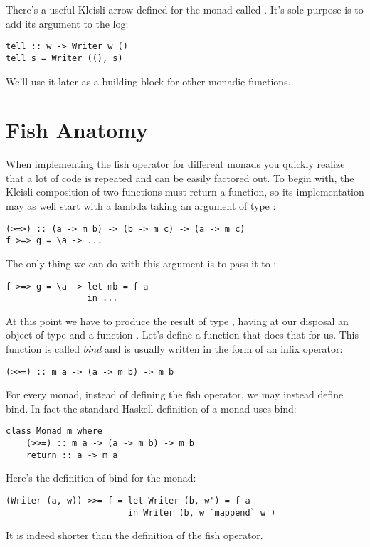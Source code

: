 There's a useful Kleisli arrow defined for the  monad
called . It's sole purpose is to add its argument to the
log:

\begin{Verbatim}
tell :: w -> Writer w ()
tell s = Writer ((), s)
\end{Verbatim}
We'll use it later as a building block for other monadic functions.

\section{Fish Anatomy}

When implementing the fish operator for different monads you quickly
realize that a lot of code is repeated and can be easily factored out.
To begin with, the Kleisli composition of two functions must return a
function, so its implementation may as well start with a lambda taking
an argument of type :

\begin{Verbatim}
(>=>) :: (a -> m b) -> (b -> m c) -> (a -> m c)
f >=> g = \a -> ...
\end{Verbatim}
The only thing we can do with this argument is to pass it to :

\begin{Verbatim}
f >=> g = \a -> let mb = f a
                in ...
\end{Verbatim}
At this point we have to produce the result of type ,
having at our disposal an object of type  and a function
. Let's define a function that
does that for us. This function is called \emph{bind} and is usually written in
the form of an infix operator:

\begin{Verbatim}
(>>=) :: m a -> (a -> m b) -> m b
\end{Verbatim}
For every monad, instead of defining the fish operator, we may instead
define bind. In fact the standard Haskell definition of a monad uses
bind:

\begin{Verbatim}
class Monad m where
    (>>=) :: m a -> (a -> m b) -> m b
    return :: a -> m a
\end{Verbatim}
Here's the definition of bind for the  monad:

\begin{Verbatim}
(Writer (a, w)) >>= f = let Writer (b, w') = f a 
                        in Writer (b, w `mappend` w')
\end{Verbatim}
It is indeed shorter than the definition of the fish operator.

